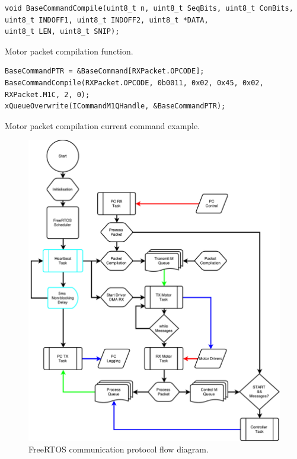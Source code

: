 \begin{listing}[ht]
\begin{verbatim}
void BaseCommandCompile(uint8_t n, uint8_t SeqBits, uint8_t ComBits, 
uint8_t INDOFF1, uint8_t INDOFF2, uint8_t *DATA, 
uint8_t LEN, uint8_t SNIP);
\end{verbatim}
\caption{Motor packet compilation function.}
\label{listing:Motor packet compilation function}
\end{listing}

\begin{listing}[ht]
\begin{verbatim}
BaseCommandPTR = &BaseCommand[RXPacket.OPCODE];
BaseCommandCompile(RXPacket.OPCODE, 0b0011, 0x02, 0x45, 0x02,
RXPacket.M1C, 2, 0);
xQueueOverwrite(ICommandM1QHandle, &BaseCommandPTR);
\end{verbatim}
\caption{Motor packet compilation current command example.}
\label{listing:Motor packet compilation example}
\end{listing}

\begin{figure}
\centering
\includegraphics[width=1\textwidth]{images/comms/communication-flow-diagram.pdf} 
\caption{FreeRTOS communication protocol flow diagram.}
\label{fig:FreeRTOS communication protocol flow diagram.}
\end{figure}

